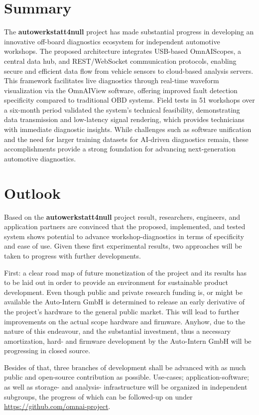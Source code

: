 \section{Summary}
The \textbf{autowerkstatt4null} project has made substantial progress in developing an innovative off-board diagnostics ecosystem for independent automotive workshops. 
The proposed architecture integrates USB-based OmnAIScopes, a central data hub, and REST/WebSocket communication protocols, 
enabling secure and efficient data flow from vehicle sensors to cloud-based analysis servers. 
This framework facilitates live diagnostics through real-time waveform visualization via the OmnAIView software, 
offering improved fault detection specificity compared to traditional OBD systems. 
Field tests in 51 workshops over a six-month period validated the system's technical feasibility, 
demonstrating data transmission and low-latency signal rendering, which provides technicians with immediate diagnostic insights. 
While challenges such as software unification and the need for larger training datasets for AI-driven diagnostics remain, 
these accomplishments provide a strong foundation for advancing next-generation automotive diagnostics.

\section{Outlook}
Based on the \textbf{autowerkstatt4null} project result, researchers, engineers, and application partners are convinced that the proposed, 
implemented, and tested system shows potential to advance workshop-diagnostics in terms of specificity and ease of use.
Given these first experimental results, two approaches will be taken to progress with further developments. 

First: a clear road map of future monetization of the project and its results has to be laid out in order to provide an environment for sustainable product development. 
Even though public and private research funding is, or might be available the Auto-Intern GmbH is determined to release an early derivative of the project's hardware to the general public market. 
This will lead to further improvements on the actual scope hardware and firmware. 
Anyhow, due to the nature of this endeavour, and the substantial investment, thus a necessary amortization, hard- and firmware development by the Auto-Intern GmbH will be progressing in closed source. 

Besides of that, three branches of development shall be advanced with as much public and open-source contribution as possible. 
Use-cases; application-software; as well as storage- and analysis- infrastructure will be organized in independent subgroups, 
the progress of which can be followed-up on under \url{https://github.com/omnai-project}.

